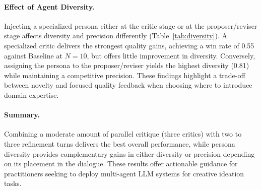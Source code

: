 \documentclass[11pt]{article}
\begin{document}
\paragraph{Effect of Agent Diversity.} Injecting a specialized persona either at the critic stage or at the proposer/reviser stage affects diversity and precision differently (Table~\ref{tab:diversity}). A specialized critic delivers the strongest quality gains, achieving a win rate of 0.55 against Baseline at $N{=}10$, but offers little improvement in diversity. Conversely, assigning the persona to the proposer/reviser yields the highest diversity (0.81) while maintaining a competitive precision. These findings highlight a trade-off between novelty and focused quality feedback when choosing where to introduce domain expertise.

\paragraph{Summary.} Combining a moderate amount of parallel critique (three critics) with two to three refinement turns delivers the best overall performance, while persona diversity provides complementary gains in either diversity or precision depending on its placement in the dialogue. These results offer actionable guidance for practitioners seeking to deploy multi-agent LLM systems for creative ideation tasks.

\begin{table}[t]
\centering
{}
\caption{Impact of agent parallelism (number of critics) on diversity and Precision@N}
\label{tab:parallelism}
\end{table}
\end{document}
